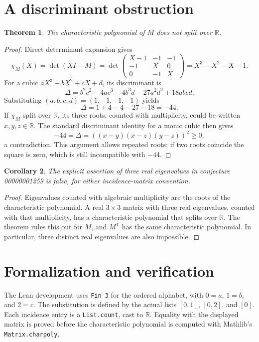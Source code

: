 \documentclass[11pt]{article}
\newtheorem{theorem}{Theorem}
\newtheorem{corollary}[theorem]{Corollary}
\begin{document}
\section{A discriminant obstruction}
\begin{theorem}
The characteristic polynomial of $M$ does not split over $\mathbb R$.
\end{theorem}
\begin{proof}
Direct determinant expansion gives
\[
 \chi_M(X)=\det(XI-M)
 =\det\begin{pmatrix}X-1&-1&-1\\-1&X&0\\0&-1&X\end{pmatrix}
 =X^3-X^2-X-1.
\]
For a cubic $aX^3+bX^2+cX+d$, its discriminant is
\[
 \Delta=b^2c^2-4ac^3-4b^3d-27a^2d^2+18abcd.
\]
Substituting $(a,b,c,d)=(1,-1,-1,-1)$ yields
\[
 \Delta=1+4-4-27-18=-44.
\]
If $\chi_M$ split over $\mathbb R$, its three roots, counted with multiplicity, could be written $x,y,z\in\mathbb R$. The standard discriminant identity for a monic cubic then gives
\[
 -44=\Delta=((x-y)(x-z)(y-z))^2\geq0,
\]
a contradiction. This argument allows repeated roots; if two roots coincide the square is zero, which is still incompatible with $-44$.
\end{proof}
\begin{corollary}
The explicit assertion of three real eigenvalues in conjecture 00000001259 is false, for either incidence-matrix convention.
\end{corollary}
\begin{proof}
Eigenvalues counted with algebraic multiplicity are the roots of the characteristic polynomial. A real $3\times3$ matrix with three real eigenvalues, counted with that multiplicity, has a characteristic polynomial that splits over $\mathbb R$. The theorem rules this out for $M$, and $M^{\mathsf T}$ has the same characteristic polynomial. In particular, three distinct real eigenvalues are also impossible.
\end{proof}

\clearpage
\section{Formalization and verification}
The Lean development uses \texttt{Fin 3} for the ordered alphabet, with $0=a$, $1=b$, and $2=c$. The substitution is defined by the actual lists $[0,1]$, $[0,2]$, and $[0]$. Each incidence entry is a \texttt{List.count}, cast to $\mathbb R$. Equality with the displayed matrix is proved before the characteristic polynomial is computed with Mathlib's \texttt{Matrix.charpoly}.
\end{document}
